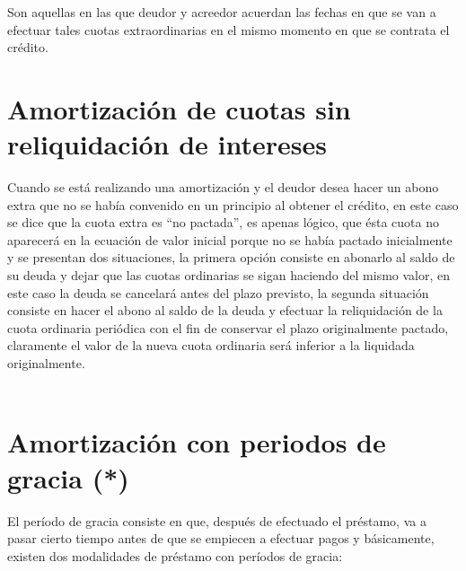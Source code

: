 Son aquellas en las que deudor y acreedor acuerdan las fechas en que se van a efectuar tales cuotas extraordinarias en el mismo momento en que se contrata el crédito.\\



\section{Amortización de cuotas sin reliquidación de intereses }
Cuando se está realizando una amortización y el deudor desea hacer un abono extra que no se había convenido en un principio al obtener el crédito, en este caso se dice que la cuota extra es “no pactada”, es apenas lógico, que ésta cuota no aparecerá en la ecuación de valor inicial porque no se había pactado inicialmente y se presentan dos situaciones, la primera opción consiste en abonarlo al saldo de su deuda y dejar que las cuotas ordinarias se sigan haciendo del mismo valor, en este caso la deuda se cancelará antes del plazo previsto, la segunda situación consiste en hacer el abono al saldo de la deuda y efectuar la reliquidación de la cuota ordinaria periódica con el fin de conservar el plazo originalmente pactado, claramente el valor de la nueva cuota ordinaria será inferior a la liquidada originalmente.
\\\\



\section{Amortización con periodos de gracia (*)}
El período de gracia consiste en que, después de efectuado el préstamo, va a pasar cierto tiempo antes de que se empiecen a efectuar pagos y básicamente, existen dos modalidades de préstamo con períodos de gracia:\\

